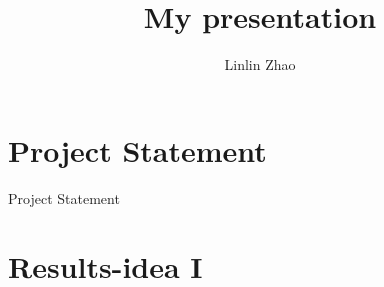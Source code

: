 \documentclass[xcolor=svgnames,handout]{beamer}
\title
  [Hacking S\hspace{2em}]
  {My presentation}
\author
  [Linlin Zhao]
  {Linlin Zhao}
\date
\institute
  {My cool place}
\begin{document}
\maketitle

\section{Project Statement}

\begin{frame}{Project Statement}



        
\end{frame}



\section{Results-idea I}
  
\end{document}
